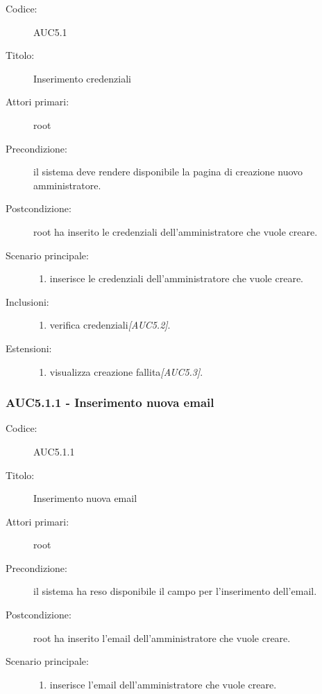 \documentclass[casi-duso]{subfiles}
\begin{document}
\begin{description}
  \item[Codice:] AUC5.1
  \item[Titolo:] Inserimento credenziali
  \item[Attori primari:] root
  \item[Precondizione:] il sistema deve rendere disponibile la pagina di creazione nuovo amministratore.
  \item[Postcondizione:] root ha inserito le credenziali dell'amministratore che vuole creare.
  \item[Scenario principale:]
  \begin{enumerate}
    \item {} inserisce le credenziali dell'amministratore che vuole creare.
  \end{enumerate}
  \item[Inclusioni:]
  \begin{enumerate}
    \item verifica credenziali\emph{[AUC5.2]}.
  \end{enumerate}
  \item[Estensioni:]
  \begin{enumerate}
    \item  visualizza creazione fallita\emph{[AUC5.3]}.
  \end{enumerate}
\end{description}

\subsubsection{AUC5.1.1 - Inserimento nuova email}%
\label{subsub:AUC5.1.1}
\begin{description}
  \item[Codice:] AUC5.1.1
  \item[Titolo:] Inserimento nuova email
  \item[Attori primari:] root
  \item[Precondizione:] il sistema ha reso disponibile il campo per l'inserimento dell'email.
  \item[Postcondizione:] root ha inserito l'email dell'amministratore che vuole creare.
  \item[Scenario principale:]
  \begin{enumerate}
    \item {} inserisce l'email dell'amministratore che vuole creare.
  \end{enumerate}
\end{description}
\end{document}
